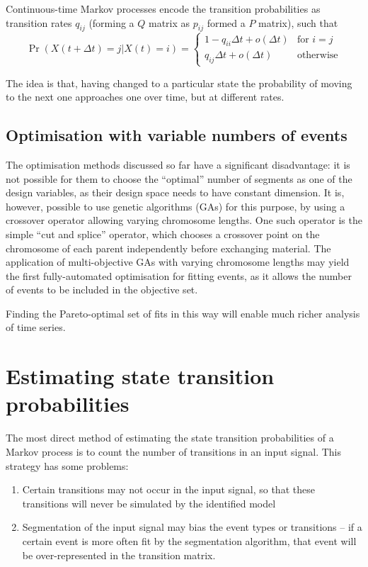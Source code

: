 Continuous-time Markov processes encode the transition probabilities as
transition rates $q_{ij}$ (forming a $Q$ matrix as $p_{ij}$ formed a
$P$ matrix), such that
\begin{equation}
  \label{eq:contmarkov}
  \Pr(X(t+\Delta t) = j | X(t) = i) = 
  \begin{cases}
    1 - q_{ii}\Delta t + o(\Delta t) & \text{for } i = j \\
    q_{ij}\Delta t + o(\Delta t) & \text{otherwise}
  \end{cases}
\end{equation}

The idea is that, having changed to a particular state the probability of moving to the next one approaches one over time, but at different rates.


\subsection{Optimisation with variable numbers of events}
The optimisation methods discussed so far have a significant
disadvantage: it is not possible for them to choose the ``optimal''
number of segments as one of the design variables, as their design space
needs to have constant dimension. It is, however, possible to use
genetic algorithms (GAs) for this purpose, by using a crossover
operator allowing varying chromosome lengths.  One such operator is
the simple ``cut and splice'' operator, which chooses a crossover
point on the chromosome of each parent independently before exchanging
material.  The application of multi-objective GAs with varying
chromosome lengths may yield the first fully-automated optimisation
for fitting events, as it allows the number of events to be included
in the objective set.

Finding the Pareto-optimal set of fits in this way will enable much
richer analysis of time series.

\section{Estimating state transition probabilities}
The most direct method of estimating the state transition
probabilities of a Markov process is to count the number of
transitions in an input signal.  This strategy has some problems:
\begin{enumerate}
\item Certain transitions may not occur in the input signal, so that
  these transitions will never be simulated by the identified model
\item Segmentation of the input signal may bias the event types or
  transitions -- if a certain event is more often fit by the
  segmentation algorithm, that event will be over-represented in the
  transition matrix.
\end{enumerate}

